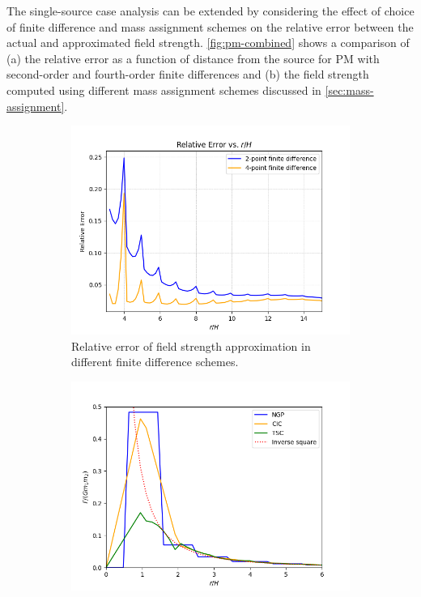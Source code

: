 The single-source case analysis can be extended by considering the effect of choice of finite difference and mass assignment schemes on the relative error between the actual and approximated field strength.
\autoref{fig:pm-combined} shows a comparison of (a) the relative error as a function of distance from the source for PM with second-order and fourth-order finite differences and (b) the field strength computed using different mass assignment schemes discussed in \autoref{sec:mass-assignment}.
\begin{figure}[!ht]
    \centering
    \begin{subfigure}[t]{0.48\textwidth}
        \centering
        \includegraphics[width=\linewidth]{chapters/pm-method/img/pm-finite-diff-err.png}
        \caption{Relative error of field strength approximation in different finite difference schemes.}
        \label{fig:pm-finite-diff-err}
    \end{subfigure}
    \hfill
    \begin{subfigure}[t]{0.48\textwidth}
        \centering
        \includegraphics[width=\linewidth]{chapters/pm-method/img/pm-mass-assignment.png}

\end{subfigure}
\end{figure}
